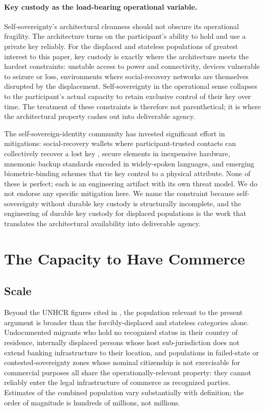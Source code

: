 \documentclass[11pt,a4paper]{article}
\theoremstyle{remark}
\begin{document}
\paragraph{Key custody as the load-bearing operational variable.}
Self-sovereignty's architectural cleanness should not obscure
its operational fragility. The architecture turns on the
participant's ability to hold and use a private key reliably.
For the displaced and stateless populations of greatest interest
to this paper, key custody is exactly where the architecture
meets the hardest constraints: unstable access to power and
connectivity, devices vulnerable to seizure or loss, environments
where social-recovery networks are themselves disrupted by the
displacement. Self-sovereignty in the operational sense
collapses to the participant's actual capacity to retain
exclusive control of their key over time. The
 treatment of these constraints is
therefore not parenthetical; it is where the architectural
property cashes out into deliverable agency.

The self-sovereign-identity community has invested significant
effort in mitigations: social-recovery wallets where
participant-trusted contacts can collectively recover a lost key
\citep{buterin2021socialrecovery, argent_social_recovery,
safe_social_recovery}, secure
elements in inexpensive hardware, mnemonic backup standards
encoded in widely-spoken languages, and emerging
biometric-binding schemes that tie key control to a physical
attribute. None of these is perfect; each is an engineering
artifact with its own threat model. We do not endorse any
specific mitigation here. We name the constraint because
self-sovereignty without durable key custody is structurally
incomplete, and the engineering of durable key custody for
displaced populations is the work that translates the
architectural availability into deliverable agency.

\section{The Capacity to Have Commerce}
\label{sec:capacity}

\subsection{Scale}

Beyond the UNHCR figures cited in , the population
relevant to the present argument is broader than the
forcibly-displaced and stateless categories alone. Undocumented
migrants who hold no recognized status in their country of
residence, internally displaced persons whose host
sub-jurisdiction does not extend banking infrastructure to their
location, and populations in failed-state or contested-sovereignty
zones whose nominal citizenship is not exercisable for commercial
purposes all share the operationally-relevant property: they
cannot reliably enter the legal infrastructure of commerce as
recognized parties. Estimates of the combined population vary
substantially with definition; the order of magnitude is
hundreds of millions, not millions.
\end{document}
